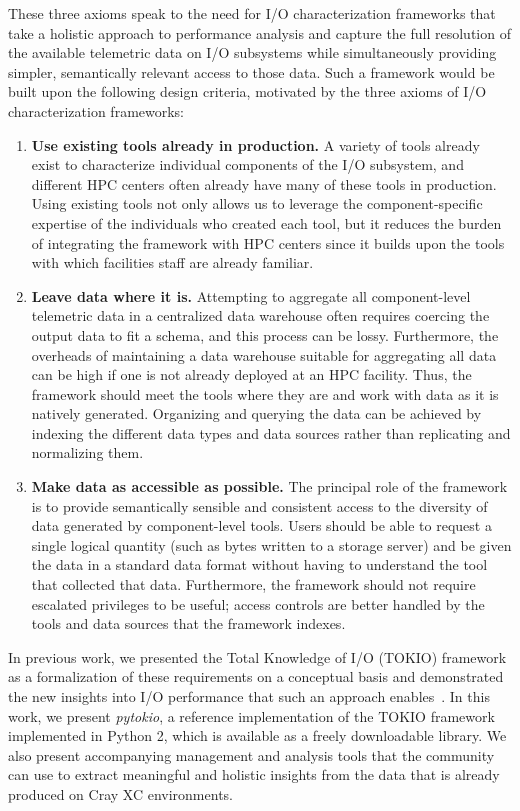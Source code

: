 These three axioms speak to the need for I/O characterization frameworks that take a holistic approach to performance analysis and capture the full resolution of the available telemetric data on I/O subsystems while simultaneously providing simpler, semantically relevant access to those data.
Such a framework would be built upon the following design criteria, motivated by the three axioms of I/O characterization frameworks:

\begin{enumerate}[leftmargin=*]
\item \label{design:existingtools} \textbf{Use existing tools already in production.}
A variety of tools already exist to characterize individual components of the I/O subsystem, and different HPC centers often already have many of these tools in production.
Using existing tools not only allows us to leverage the component-specific expertise of the individuals who created each tool, but it reduces the burden of integrating the framework with HPC centers since it builds upon the tools with which facilities staff are already familiar.

\item \label{design:leavedata} \textbf{Leave data where it is.}
Attempting to aggregate all component-level telemetric data in a centralized data warehouse often requires coercing the output data to fit a schema, and this process can be lossy.
Furthermore, the overheads of maintaining a data warehouse suitable for aggregating all data can be high if one is not already deployed at an HPC facility.
Thus, the framework should meet the tools where they are and work with data as it is natively generated. 
Organizing and querying the data can be achieved by indexing the different data types and data sources rather than replicating and normalizing them.

\item \label{design:accessible} \textbf{Make data as accessible as possible.}
The principal role of the framework is to provide semantically sensible and consistent access to the diversity of data generated by component-level tools.
Users should be able to request a single logical quantity (such as bytes written to a storage server) and be given the data in a standard data format without having to understand the tool that collected that data.
Furthermore, the framework should not require escalated privileges to be useful; access controls are better handled by the tools and data sources that the framework indexes.
\end{enumerate}

In previous work, we presented the Total Knowledge of I/O (TOKIO) framework as a formalization of these requirements on a conceptual basis and demonstrated the new insights into I/O performance that such an approach enables~\cite{Lockwood2017}.
In this work, we present \emph{pytokio}, a reference implementation of the TOKIO framework implemented  in Python 2, which is available as a freely downloadable library.
We also present accompanying management and analysis tools that the community can use to extract meaningful and holistic insights from the data that is already produced on Cray XC environments.